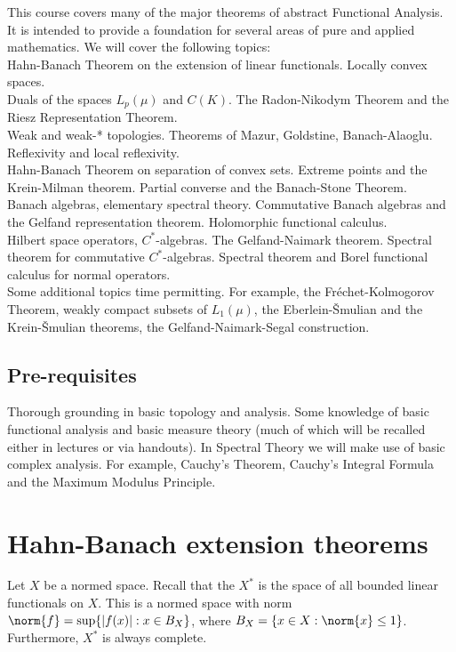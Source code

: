 \documentclass[a4paper]{article}
\begin{document}
\maketitle
{\small \setlength{\parindent}{0em}
This course covers many of the major theorems of abstract Functional Analysis. It is intended to provide a foundation for several areas of pure and applied mathematics. We will cover the following topics:\\
Hahn-Banach Theorem on the extension of linear functionals. Locally convex spaces.\\
Duals of the spaces $L_p(\mu)$ and $C(K)$. The Radon-Nikodym Theorem and the Riesz Representation Theorem.\\
Weak and weak-* topologies. Theorems of Mazur, Goldstine, Banach-Alaoglu. Reflexivity and local reflexivity.\\
Hahn-Banach Theorem on separation of convex sets. Extreme points and the Krein-Milman theorem. Partial converse and the Banach-Stone Theorem.\\
Banach algebras, elementary spectral theory. Commutative Banach algebras and the Gelfand representation theorem. Holomorphic functional calculus.\\
Hilbert space operators, $C^*$-algebras. The Gelfand-Naimark theorem. Spectral theorem for commutative $C^*$-algebras. Spectral theorem and Borel functional calculus for normal operators.\\
Some additional topics time permitting. For example, the Fr\'echet-Kolmogorov Theorem, weakly compact subsets of $L_1(\mu)$, the Eberlein-\v{S}mulian and the Krein-\v{S}mulian theorems, the Gelfand-Naimark-Segal construction.

\subsection*{Pre-requisites}
\vspace{-\parskip}
Thorough grounding in basic topology and analysis. Some knowledge of basic functional analysis and
basic measure theory (much of which will be recalled either in lectures or via handouts). In Spectral
Theory we will make use of basic complex analysis. For example, Cauchy's Theorem, Cauchy's Integral
Formula and the Maximum Modulus Principle.
}

\tableofcontents

\section{Hahn-Banach extension theorems}
Let $X$ be a normed space. Recall that the  $X^*$ is the space of all bounded linear functionals on $X$. This is a normed space with norm $\norm{f}=\sup\{|f(x)|:x\in B_X\}$, where $B_X=\{x\in X:\norm{x}\leq 1\}$. Furthermore, $X^*$ is always complete.
\end{document}
